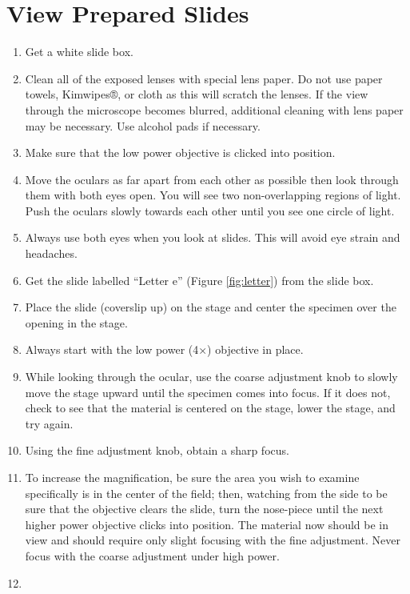 \documentclass[]{book}
\providecommand{\tightlist}{%
  \setlength{\itemsep}{0pt}\setlength{\parskip}{0pt}}
\begin{document}
\hypertarget{view-prepared-slides}{%
\section{View Prepared Slides}\label{view-prepared-slides}}

\begin{enumerate}
\def\labelenumi{\arabic{enumi}.}
\tightlist
\item
  Get a white slide box.
\item
  Clean all of the exposed lenses with special lens paper. Do not use paper towels, Kimwipes®, or cloth as this will scratch the lenses. If the view through the microscope becomes blurred, additional cleaning with lens paper may be necessary. Use alcohol pads if necessary.
\item
  Make sure that the low power objective is clicked into position.
\item
  Move the oculars as far apart from each other as possible then look through them with
  both eyes open. You will see two non-overlapping regions of light. Push the oculars slowly towards each other until you see one circle of light.
\item
  Always use both eyes when you look at slides. This will avoid eye strain and headaches.
\item
  Get the slide labelled ``Letter e'' (Figure \ref{fig:letter}) from the slide box.
\item
  Place the slide (coverslip up) on the stage and center the specimen over the opening in the stage.
\item
  Always start with the low power (4×) objective in place.
\item
  While looking through the ocular, use the coarse adjustment knob to slowly move the stage upward until the specimen comes into focus. If it does not, check to see that the material is centered on the stage, lower the stage, and try again.
\item
  Using the fine adjustment knob, obtain a sharp focus.
\item
  To increase the magnification, be sure the area you wish to examine specifically is in the center of the field; then, watching from the side to be sure that the objective clears the slide, turn the nose-piece until the next higher power objective clicks into position. The material now should be in view and should require only slight focusing with the fine adjustment. Never focus with the coarse adjustment under high power.
\item

\end{enumerate}
\end{document}
